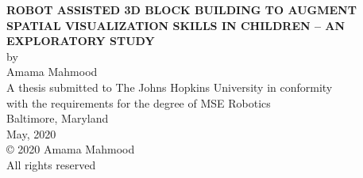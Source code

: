\thispagestyle{empty}
\baselineskip=18pt
\begin{center}
\vspace*{3\baselineskip}
%
{\bfseries ROBOT ASSISTED 3D BLOCK BUILDING TO AUGMENT SPATIAL VISUALIZATION SKILLS IN CHILDREN – AN EXPLORATORY STUDY }\\[6\baselineskip]
%
by\\
%
Amama Mahmood\\[3\baselineskip]
%
%
A thesis submitted to The Johns Hopkins University in conformity\\
with the requirements for the degree of MSE Robotics\\[4\baselineskip]
%
Baltimore, Maryland\\
May, 2020\\[6\baselineskip]
%
{\copyright{} 2020 Amama Mahmood\\
All rights reserved}
%
\end{center}
%
\baselineskip=24pt
\newpage 
